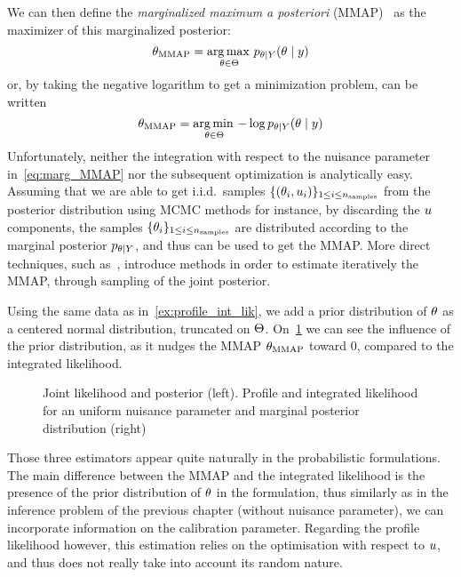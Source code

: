 \documentclass[../../Main_ManuscritThese.tex]{subfiles}
\newcommand\imgpath{/home/victor/acadwriting/Manuscrit/Text/Chapter3/img/}
\begin{document}
We can then define the \emph{marginalized maximum a posteriori} (MMAP)~\cite{doucet_marginal_2002} as the  maximizer of this marginalized posterior:
\begin{equation}
  \label{eq:def_MMAP}
  {\theta}_{\mathrm{MMAP}} = \operatorname*{arg\,max \,}_{\theta\in\Theta} p_{\theta \mid Y}(\theta\mid y)
\end{equation}
or, by taking the negative logarithm to get a minimization problem, can be written
\begin{equation}
{\theta}_{\mathrm{MMAP}} = \operatorname*{arg\,min \,}_{\theta\in\Theta} -\log  p_{\theta\mid Y}(\theta\mid y)
\end{equation}
Unfortunately, neither the integration with respect to the nuisance parameter in~\eqref{eq:marg_MMAP} nor the subsequent optimization is analytically easy.
Assuming that we are able to get i.i.d.\ samples $\{(\theta_i, u_i)\}_{1\leq i \leq n_{\mathrm{samples}}}$ from the posterior distribution using MCMC methods for instance, by discarding the $u$ components, the samples $\{\theta_i\}_{1 \leq i\leq n_{\mathrm{samples}}}$ are distributed according to the marginal posterior $p_{\theta \mid Y}$, and thus can be used to get the MMAP. More direct techniques, such as~\cite{doucet_marginal_2002}, introduce methods in order to estimate iteratively the MMAP, through sampling of the joint posterior.
\begin{example}
  Using the same data as in~\cref{ex:profile_int_lik}, we add a prior distribution of $\theta$ as a centered normal distribution, truncated on $\Theta$. On~\cref{fig:profile_integrated_lik} we can see the influence of the prior distribution, as it nudges the MMAP ${\theta}_{\mathrm{MMAP}}$ toward $0$, compared to the integrated likelihood.
\end{example}
\begin{figure}[ht]
  \centering
  
  \caption[Joint likelihood and posterior distribution]{\label{fig:profile_integrated_lik} Joint likelihood and posterior (left). Profile and integrated likelihood for an uniform nuisance parameter and marginal posterior distribution (right)}
\end{figure}
Those three estimators appear quite naturally in the probabilistic formulations. The main difference between the MMAP and the integrated likelihood is the presence of the prior distribution of $\theta$ in the formulation, thus similarly as in the inference problem of the previous chapter (without nuisance parameter), we can incorporate information on the calibration parameter. Regarding the profile likelihood however, this estimation relies on the optimisation with respect to $u$, and thus does not really take into account its random nature.
\end{document}

